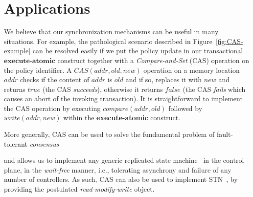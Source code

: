 \documentclass[conference]{sigcomm-alternate}
\newcommand{\hide}[1]{}
\newcommand{\cas}{CAS\xspace}
\newcommand{\compare}{compare\xspace}
\newcommand{\memwrite}{write\xspace}
\newcommand{\addr}{\textit{addr}\xspace}
\newcommand{\execatomic}{\textbf{execute-atomic}}
\newcommand{\true}{\textit{true}}
\newcommand{\false}{\textit{false}}
\begin{document}
\section{Applications}\label{sec:apps}

We believe that our synchronization mechanisms
can be useful in many situations.
For example, the pathological scenario described in
Figure~\ref{fig:CAS-example} can be resolved easily if we put
the policy update in our transactional $\execatomic$ construct together
 with a \emph{Compare-and-Set} (CAS) operation on the policy identifier.
A $\cas(\addr,\textit{old},\textit{new})$ operation on a memory location $\addr$
checks if the content of $\addr$ is $\textit{old}$ and if so,
replaces it with $\textit{new}$ and returns $\true$ (the CAS
\emph{succeeds}), otherwise it returns $\false$ (the CAS
\emph{fails} which causes an abort of
the invoking transaction).
It is straightforward to implement the CAS operation by executing
$\textit{\compare}(\addr, old)$ followed by $\textit{\memwrite}(\addr,
new)$ within the {\execatomic} construct.

\hide{
As can be seen Algorithm \ref{alg:cas}, CAS is implemented by two commands. These commands should be sent as part of the same bundle

\begin{algorithm}[t]
    \caption{$\textit{\cas}(\addr, old,new)$}
    \label{alg:cas}
    \begin{algorithmic}[1]

    		\State $cmd1\gets \textsc{\compare}(\addr, old) $
    		\State $cmd2\gets \textsc{\memwrite}(\addr, new) $
			\Return $cmd1,cmd2$
    \end{algorithmic}
\end{algorithm}
}

More generally, CAS can be used to solve the fundamental
problem of fault-tolerant \emph{consensus}~\cite{FLP85}
\hide{%
 in which the controllers
need to agree on one of their private inputs, despite failures of an
arbitrary number of controllers.
Indeed, each controller simply performs, within a transaction, a CAS operation to replace the default value
in a memory location at the meta-configuration of a data plane switch.
If the transaction commits, the controller considers itself
the \emph{winner} and decides on its input,
if it aborts (the controller fails in the CAS), it remains to read the
memory to get the input of the winner and decide on it.
}
and allows us
to implement any generic replicated state machine~\cite{Her91}
in the control plane,  in the \emph{wait-free} manner, i.e., tolerating
asynchrony and failure of any number of controllers.
As such, CAS can also be used to implement STN~\cite{stn},
by providing the postulated \emph{read-modify-write} object.
\end{document}
